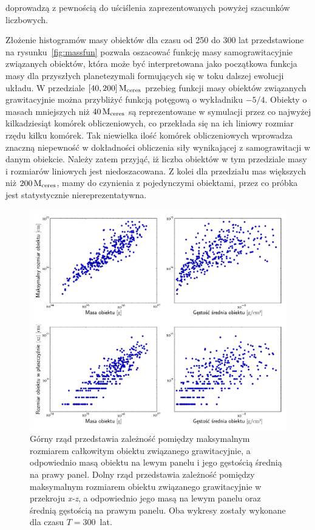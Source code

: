 doprowadzą z pewnością do uściślenia zaprezentowanych powyżej szacunków
liczbowych.
%
\par Złożenie histogramów masy obiektów dla czasu od 250 do 300 lat
przedstawione na rysunku~\ref{fig:massfun} pozwala oszacować funkcję masy
samograwitacyjnie związanych obiektów, która może być interpretowana jako
początkowa funkcja masy dla przyszłych planetezymali formujących się w toku
dalszej ewolucji układu. W przedziale $[40, 200]\hbox{$\mathrm{\thinspace M_{\textrm{ceres}}}$}$ przebieg funkcji masy
obiektów związanych grawitacyjnie można przybliżyć funkcją potęgową o wykładniku
$-5/4$. Obiekty o masach mniejszych niż $40\hbox{$\mathrm{\thinspace M_{\textrm{ceres}}}$}$ są reprezentowane w
symulacji przez co najwyżej kilkadziesiąt komórek obliczeniowych, co przekłada
się na ich liniowy rozmiar rzędu kilku komórek. Tak niewielka ilość komórek
obliczeniowych wprowadza znaczną niepewność w dokładności obliczenia
siły wynikającej z samograwitacji w danym obiekcie. Należy zatem przyjąć, iż
liczba obiektów w tym przedziale masy i rozmiarów liniowych jest 
niedoszacowana. Z kolei dla przedziału mas większych niż $200\hbox{$\mathrm{\thinspace M_{\textrm{ceres}}}$}$, mamy
do czynienia z pojedynczymi obiektami, przez co próbka jest statystycznie
niereprezentatywna.
%
\begin{figure}[ht]
   \centering
   \includegraphics[width=0.99\linewidth]{figures/fig_mass_size}
   \caption{Górny rząd przedstawia zależność pomiędzy maksymalnym rozmiarem
      całkowitym obiektu związanego grawitacyjnie, a odpowiednio masą obiektu na
      lewym panelu i jego gęstością średnią na prawy panel. Dolny rząd
      przedstawia zależność pomiędzy maksymalnym rozmiarem obiektu związanego
   grawitacyjnie w przekroju \emph{x-z}, a odpowiednio jego masą na lewym panelu
oraz średnią gęstością na prawym panelu. Oba  wykresy zostały wykonane dla czasu
$T=300$~lat. }
   \label{fig:mass_size}
\end{figure}
